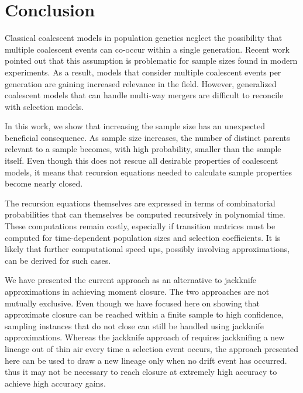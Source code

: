 \documentclass[review]{elsarticle}
\begin{document}
\section{Conclusion}
\label{sec_conclusion}


Classical coalescent models in population genetics neglect the possibility that multiple coalescent events 
can co-occur within a single generation. 
Recent work \citep{BhaskarEtAl2014,NelsonEtAl2019} pointed out that this
assumption is problematic for sample sizes found in modern experiments. As a result, models
that consider multiple coalescent events per generation are gaining increased relevance in the field.
However, generalized coalescent models that can handle multi-way mergers are difficult to reconcile 
with selection models.

In this work, we show that increasing the sample size has an unexpected beneficial consequence. 
As sample size increases, the number of distinct parents relevant to a sample becomes, 
with high probability, smaller than the sample itself. Even though this does not rescue
all desirable properties of coalescent models, it means that recursion equations 
needed to calculate sample properties become nearly closed. 

The recursion equations themselves  are expressed in terms of combinatorial probabilities 
that can themselves be computed recursively in polynomial time. These computations 
remain costly, especially if transition matrices must be computed for time-dependent
population sizes and selection coefficients. It is likely that further computational 
speed ups, possibly involving approximations, can be derived for such cases.  

We have presented the current approach as an alternative to jackknife approximations in 
achieving moment closure. The two approaches are not mutually exclusive. 
Even though we have focused here on showing that approximate closure can be reached within 
a finite sample to high confidence, sampling instances that do not close can still be handled 
using jackknife approximations. Whereas the jackknife approach of  \citep{JouganousEtAl2017} requires 
jackknifing a new lineage out of thin air every time a selection event occurs, the approach presented
here can be used to draw a new lineage only when no drift event has occurred. 
thus it may not be necessary to reach closure at extremely high accuracy to achieve high accuracy
gains. 
\end{document}
